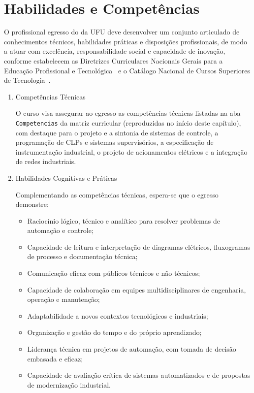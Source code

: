\section{Habilidades e Competências}

O profissional egresso do \ppccurso da UFU deve desenvolver um conjunto articulado de conhecimentos técnicos, habilidades práticas e disposições profissionais, de modo a atuar com excelência, responsabilidade social e capacidade de inovação, conforme estabelecem as Diretrizes Curriculares Nacionais Gerais para a Educação Profissional e Tecnológica~\cite{cne_cp_1_2021} e o Catálogo Nacional de Cursos Superiores de Tecnologia~\cite{mec_cncst_2024}.

\begin{enumerate}[label=\Roman*.]
\item Competências Técnicas~\cite{mec_cncst_2024}

O curso visa assegurar ao egresso as competências técnicas listadas na aba \texttt{Competencias} da matriz curricular (reproduzidas no início deste capítulo), com destaque para o projeto e a sintonia de sistemas de controle, a programação de CLPs e sistemas supervisórios, a especificação de instrumentação industrial, o projeto de acionamentos elétricos e a integração de redes industriais.

\item Habilidades Cognitivas e Práticas~\cite{cne_cp_1_2021}

Complementando as competências técnicas, espera-se que o egresso demonstre:

\begin{itemize}
    \item Raciocínio lógico, técnico e analítico para resolver problemas de automação e controle;
    \item Capacidade de leitura e interpretação de diagramas elétricos, fluxogramas de processo e documentação técnica;
    \item Comunicação eficaz com públicos técnicos e não técnicos;
    \item Capacidade de colaboração em equipes multidisciplinares de engenharia, operação e manutenção;
    \item Adaptabilidade a novos contextos tecnológicos e industriais;
    \item Organização e gestão do tempo e do próprio aprendizado;
    \item Liderança técnica em projetos de automação, com tomada de decisão embasada e eficaz;
    \item Capacidade de avaliação crítica de sistemas automatizados e de propostas de modernização industrial.
\end{itemize}


\end{enumerate}
